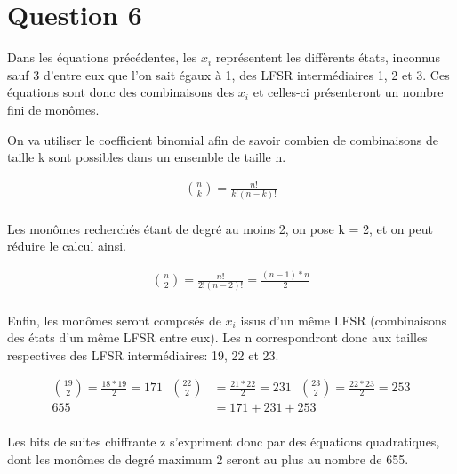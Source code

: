 \section{Question 6}

Dans les équations précédentes, les $x_i$ représentent les diffèrents états, inconnus sauf 3 d'entre eux que l'on sait égaux à 1, des LFSR intermédiaires 1, 2 et 3. Ces équations sont donc des combinaisons des $x_i$ et celles-ci présenteront un nombre fini de monômes.

On va utiliser le coefficient binomial afin de savoir combien de combinaisons de taille k sont possibles dans un ensemble de taille n.

\begin{equation}
  \begin{aligned}
    \binom{n}{k}=\frac{n!}{k!(n-k)!}\\
  \end{aligned}
\end{equation}

Les monômes recherchés étant de degré au moins 2, on pose k = 2, et on peut réduire le calcul ainsi.

\begin{equation}
  \begin{aligned}
    \binom{n}{2}=\frac{n!}{2!(n-2)!}=\frac{(n-1)*n}{2}\\
  \end{aligned}
\end{equation}

Enfin, les monômes seront composés de $x_i$ issus d'un même LFSR (combinaisons des états d'un même LFSR entre eux). Les n correspondront donc aux tailles respectives des LFSR intermédiaires: 19, 22 et 23.

\begin{equation}
  \begin{aligned}
    \binom{19}{2}=\frac{18*19}{2}=171\ \ \ \binom{22}{2}&=\frac{21*22}{2}=231\ \ \ \binom{23}{2}=\frac{22*23}{2}=253\\
    655&=171+231+253\\
  \end{aligned}
\end{equation}

Les bits de suites chiffrante z s'expriment donc par des équations quadratiques, dont les monômes de degré maximum 2 seront au plus au nombre de 655.
